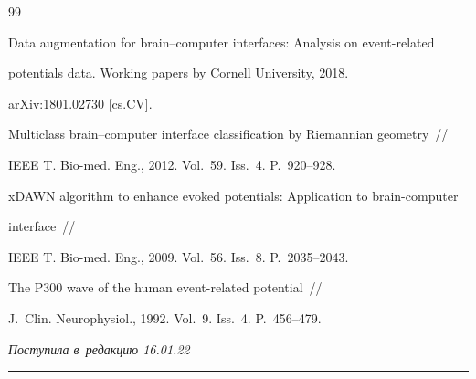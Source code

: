 {{\begin{thebibliography}{99}

Data augmentation for brain--computer interfaces: Analysis on event-related 

potentials data. Working papers by Cornell University,  2018. 

arXiv:1801.02730 [cs.CV].





Multiclass brain--computer interface classification by Riemannian geometry~/\!\!/

IEEE T. Bio-med. Eng., 2012. Vol.~59. Iss.~4. P.~920--928.





{xDAWN} algorithm to enhance evoked potentials: Application to brain-computer 

interface~/\!\!/

 IEEE T. Bio-med. Eng., 2009. Vol.~56. Iss.~8. P.~2035--2043.




 The P300 wave of the human event-related potential~/\!\!/

J.~Clin. Neurophysiol., 1992. Vol.~9. Iss.~4. P.~456--479.

       \end{thebibliography}

} }







\vspace*{-3pt}



\hfill{\small\textit{Поступила в~редакцию 16.01.22}}



\vspace*{8pt}



\hrule



\vspace*{2pt}






